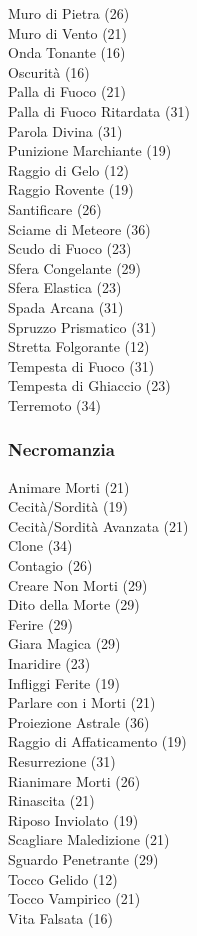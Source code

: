 \begin{multicols}{3}
	Muro di Pietra (26)\\
	Muro di Vento (21)\\
	Onda Tonante (16)\\
	Oscurità (16)\\
	Palla di Fuoco (21)\\
	Palla di Fuoco Ritardata (31)\\
	Parola Divina (31)\\
	Punizione Marchiante (19)\\
	Raggio di Gelo (12)\\
	Raggio Rovente (19)\\
	Santificare (26)\\
	Sciame di Meteore (36)\\
	Scudo di Fuoco (23)\\
	Sfera Congelante (29)\\
	Sfera Elastica (23)\\
	Spada Arcana (31)\\
	Spruzzo Prismatico (31)\\
	Stretta Folgorante (12)\\
	Tempesta di Fuoco (31)\\
	Tempesta di Ghiaccio (23)\\
	Terremoto (34)\\
	
	\subsubsection{Necromanzia}
	Animare Morti (21)\\
	Cecità/Sordità (19)\\
	Cecità/Sordità Avanzata (21)\\
	Clone (34)\\
	Contagio (26)\\
	Creare Non Morti (29)\\
	Dito della Morte (29)\\
	Ferire (29)\\
	Giara Magica (29)\\
	Inaridire (23)\\
	Infliggi Ferite (19)\\
	Parlare con i Morti (21)\\
	Proiezione Astrale (36)\\
	Raggio di Affaticamento (19)\\
	Resurrezione (31)\\
	Rianimare Morti (26)\\
	Rinascita (21)\\
	Riposo Inviolato (19)\\
	Scagliare Maledizione (21)\\
	Sguardo Penetrante (29)\\
	Tocco Gelido (12)\\
	Tocco Vampirico (21)\\
	Vita Falsata (16)\\
	

\end{multicols}
